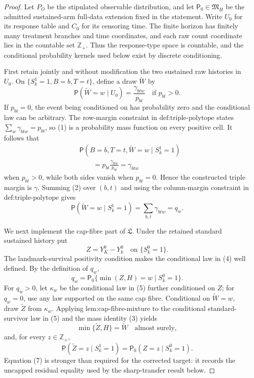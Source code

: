 \documentclass{article}
\begin{document}
\begin{proof}
Let \(P_O\) be the stipulated observable distribution, and let \(\mathsf P_0\in\mathfrak M_H\) be the admitted sustained-arm full-data extension fixed in the statement. Write \(U_0\) for its response table and \(C_0\) for its censoring time. The finite horizon has finitely many treatment branches and time coordinates, and each raw count coordinate lies in the countable set \(\mathbb Z_+\). Thus the response-type space is countable, and the conditional probability kernels used below exist by discrete conditioning.

First retain jointly and without modification the two sustained raw histories in \(U_0\). On \(\{S_k^1=1,B=b,T=t\}\), define a draw \(\widetilde W\) by
\[
 \mathsf P(\widetilde W=w\mid U_0)
 =\frac{\gamma_{btw}}{p_{bt}}\quad\text{if }p_{bt}>0.     \tag{1}
\]
If \(p_{bt}=0\), the event being conditioned on has probability zero and the conditional law can be arbitrary. The row-margin constraint in \(\text{def:triple-polytope}\) states \(\sum_w\gamma_{btw}=p_{bt}\), so (1) is a probability mass function on every positive cell. It follows that
\[
 \begin{aligned}
 &\mathsf P(B=b,T=t,\widetilde W=w\mid S_k^1=1)\\
 &\qquad=p_{bt}\frac{\gamma_{btw}}{p_{bt}}=\gamma_{btw}
 \end{aligned}                                           \tag{2}
\]
when \(p_{bt}>0\), while both sides vanish when \(p_{bt}=0\). Hence the constructed triple margin is \(\gamma\). Summing (2) over \((b,t)\) and using the column-margin constraint in \(\text{def:triple-polytope}\) gives
\[
 \mathsf P(\widetilde W=w\mid S_k^1=1)
 =\sum_{b,t}\gamma_{btw}=q_w.                            \tag{3}
\]

We next implement the cap-fibre part of \(\mathfrak L\). Under the retained standard sustained history put
\[
 Z=Y_K^0-Y_k^0\quad\text{on }\{S_k^0=1\}.               \tag{4}
\]
The landmark-survival positivity condition makes the conditional law in (4) well defined. By the definition of \(q_w\),
\[
 q_w=\mathsf P_0\{\min(Z,H)=w\mid S_k^0=1\}.             \tag{5}
\]
For \(q_w>0\), let \(\kappa_w\) be the conditional law in (5) further conditioned on \(Z\); for \(q_w=0\), use any law supported on the same cap fibre. Conditional on \(\widetilde W=w\), draw \(\widetilde Z\) from \(\kappa_w\). Applying \(\text{lem:cap-fibre-mixture}\) to the conditional standard-survivor law in (5) and the mass identity (3) yields
\[
 \min\{\widetilde Z,H\}=\widetilde W\quad\text{almost surely}, \tag{6}
\]
and, for every \(z\in\mathbb Z_+\),
\[
 \mathsf P(\widetilde Z=z\mid S_k^1=1)
 =\mathsf P_0(Z=z\mid S_k^0=1).                          \tag{7}
\]
Equation (7) is stronger than required for the corrected target: it records the uncapped residual equality used by the sharp-transfer result below.


\end{proof}
\end{document}
